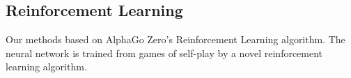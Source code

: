 \documentclass[12pt,a4paper]{article}
\begin{document}
\subsection{Reinforcement Learning}
\hspace{0.6cm}Our methods based on AlphaGo Zero's Reinforcement Learning algorithm. The neural network is trained from games of self-play by a novel reinforcement learning algorithm. 
\end{document}
